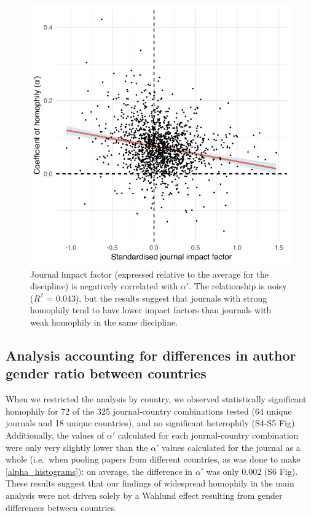 \documentclass[12pt,]{article}
\begin{document}
\begin{figure}
\centering
\includegraphics{../figures/Fig5.pdf}
\caption{Journal impact factor (expressed relative to the average for
the discipline) is negatively correlated with \(\alpha'\). The
relationship is noisy (\(R^2\) = 0.043), but the results suggest that
journals with strong homophily tend to have lower impact factors than
journals with weak homophily in the same discipline.
\label{impact_factor}}
\end{figure}

\hypertarget{analysis-accounting-for-differences-in-author-gender-ratio-between-countries}{%
\subsection{Analysis accounting for differences in author gender ratio
between
countries}\label{analysis-accounting-for-differences-in-author-gender-ratio-between-countries}}

When we restricted the analysis by country, we observed statistically
significant homophily for 72 of the 325 journal-country combinations
tested (64 unique journals and 18 unique countries), and no significant
heterophily (S4-S5 Fig). Additionally, the values of \(\alpha'\)
calculated for each journal-country combination were only very slightly
lower than the \(\alpha'\) values calculated for the journal as a whole
(i.e.~when pooling papers from different countries, as was done to make
\autoref{alpha_histograms}): on average, the difference in \(\alpha'\)
was only 0.002 (S6 Fig). These results suggest that our findings of
widespread homophily in the main analysis were not driven solely by a
Wahlund effect resulting from gender differences between countries.
\end{document}
